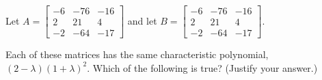 \documentclass{ximera}
\author{}
\begin{document}
\begin{exercise}
Let $A=\begin{bmatrix} -6 & -76 & -16 \\ 2 & 21 & 4 \\ -2 & -64 & -17 \end{bmatrix}$ and let $B=\begin{bmatrix} -6 & -76 & -16 \\ 2 & 21 & 4 \\ -2 & -64 & -17 \end{bmatrix}$.

Each of these matrices has the same characteristic polynomial, $(2-\lambda)(1+\lambda)^2$.  Which of the following is true?  (Justify your answer.)

 \begin{multipleChoice}
 \end{multipleChoice}

 \end{exercise}
 
\end{document}
